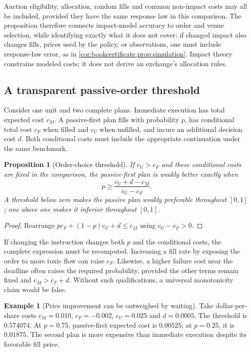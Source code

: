 \documentclass[11pt]{article}
\numberwithin{equation}{section}
\newtheorem{proposition}[theorem]{Proposition}
\theoremstyle{definition}
\theoremstyle{remark}
\theoremstyle{definition}
\newtheorem{example}[theorem]{Example}
\begin{document}
Auction eligibility, allocation, random fills and common non-impact costs may
all be included, provided they have the same response law in this comparison.
The proposition therefore connects impact-model accuracy to order and venue
selection, while identifying exactly what it does not cover: if changed impact
also changes fills, prices used by the policy, or observations, one must include
response-law error, as in \cref{cor:bookcertificate,prop:simulation}. Impact theory
constrains modeled costs; it does not derive an exchange's allocation rules.

\subsection{A transparent passive-order threshold}

Consider one unit and two complete plans. Immediate execution has total
expected cost $c_M$. A passive-first plan fills with probability $p$, has
conditional total cost $c_F$ when filled and $c_U$ when unfilled, and incurs
an additional decision cost $d$. Both conditional costs must include the
appropriate continuation under the same benchmark.

\begin{proposition}[Order-choice threshold]\label{prop:threshold}
If $c_U>c_F$ and these conditional costs are fixed in the comparison, the
passive-first plan is weakly better exactly when
\begin{equation}\label{eq:threshold}
 p\geq\frac{c_U+d-c_M}{c_U-c_F}.
\end{equation}
A threshold below zero makes the passive plan weakly preferable throughout
$[0,1]$; one above one makes it inferior throughout $[0,1]$.
\end{proposition}
\begin{proof}
Rearrange $pc_F+(1-p)c_U+d\leq c_M$ using $c_U-c_F>0$.
\end{proof}

If changing the instruction changes both $p$ and the conditional costs, the
complete expression must be recomputed. Increasing a fill rate by exposing
the order to more toxic flow can raise $c_F$. Likewise, a higher failure cost
near the deadline often raises the required probability, provided the other
terms remain fixed and $c_M>c_F+d$. Without such qualifications, a universal
monotonicity claim would be false.

\begin{example}[Price improvement can be outweighed by waiting]
Take dollar-per-share costs $c_M=0.010$, $c_F=-0.002$, $c_U=0.025$ and
$d=0.0005$. The threshold is $0.574074$. At $p=0.75$, passive-first expected
cost is $0.00525$; at $p=0.25$, it is $0.01875$. The second plan is more
expensive than immediate execution despite its favorable fill price.
\end{example}
\end{document}
